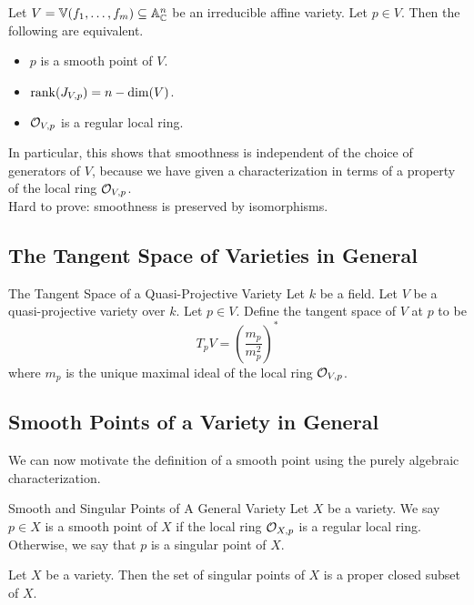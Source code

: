 \documentclass[a4paper]{article}
\begin{document}
\begin{prp}{}{} Let $V=\mathbb{V}(f_1,\dots,f_m)\subseteq\mathbb{A}_{\mathbb{C}}^n$ be an irreducible affine variety. Let $p\in V$. Then the following are equivalent. 
\begin{itemize}
\item $p$ is a smooth point of $V$. 
\item $\rank(J_{V,p})=n-\dim(V)$. 
\item $\mathcal{O}_{V,p}$ is a regular local ring. 
\end{itemize}
\end{prp}

In particular, this shows that smoothness is independent of the choice of generators of $V$, because we have given a characterization in terms of a property of the local ring $\mathcal{O}_{V,p}$. \\

Hard to prove: smoothness is preserved by isomorphisms. 

\subsection{The Tangent Space of Varieties in General}
\begin{defn}{The Tangent Space of a Quasi-Projective Variety}{} Let $k$ be a field. Let $V$ be a quasi-projective variety over $k$. Let $p\in V$. Define the tangent space of $V$ at $p$ to be $$T_pV=\left(\frac{m_p}{m_p^2}\right)^\ast$$ where $m_p$ is the unique maximal ideal of the local ring $\mathcal{O}_{V,p}$. 
\end{defn}

\subsection{Smooth Points of a Variety in General}
We can now motivate the definition of a smooth point using the purely algebraic characterization. 

\begin{defn}{Smooth and Singular Points of A General Variety}{} Let $X$ be a variety. We say $p\in X$ is a smooth point of $X$ if the local ring $\mathcal{O}_{X,p}$ is a regular local ring. Otherwise, we say that $p$ is a singular point of $X$. 
\end{defn}

\begin{thm}{}{} Let $X$ be a variety. Then the set of singular points of $X$ is a proper closed subset of $X$. 
\end{thm}
\end{document}
